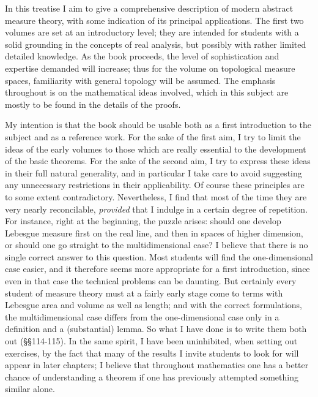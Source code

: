 \bigskip
     
 In this treatise I aim to give a
comprehensive description of modern abstract measure theory, with some
indication of its principal applications.   The first two volumes are
set at an introductory level;  they are intended for students with a
solid grounding in the concepts of real analysis, but possibly with
rather limited detailed knowledge.    As the book proceeds, the
level of sophistication and expertise demanded will increase;  thus for
the volume on topological measure spaces, familiarity with general
topology will be assumed.
The emphasis throughout is on the mathematical ideas involved, which in
this subject are mostly to be found in the details of the proofs.
     
My intention is that the book should be usable both as a first
introduction to the subject and as a reference work.   For the sake of
the first aim, I try to limit the ideas of the early volumes to those
which are really essential to the development of the basic theorems.
For the sake of the second aim, I try to express these ideas in their
full natural generality, and in particular I take care to avoid
suggesting any unnecessary restrictions in their applicability.   Of
course these principles are to some extent contradictory.
Nevertheless, I find that most of the time they are very nearly
reconcilable, {\it provided} that I indulge in a certain degree of
repetition.   For instance, right at the beginning, the puzzle arises:
should one develop Lebesgue measure first on the real line, and then in
spaces of higher dimension, or should one go straight to the
multidimensional case?   I believe that there is no single correct
answer to this question.   Most students will find the one-dimensional
case easier, and it therefore seems more appropriate for a first
introduction, since even in that case the technical problems can be
daunting.   But certainly every student of measure theory must at a
fairly early stage
come to terms with Lebesgue area and volume as well as length;
and with the correct formulations, the multidimensional case differs
from the one-dimensional case only in a definition and a (substantial)
lemma.   So what I have done is to write them both out (\S\S114-115).
In the same spirit, I have been uninhibited, when setting out exercises,
by the fact that many of the results I invite students to look for will
appear in later chapters;  I believe that throughout mathematics one has
a better chance of understanding a theorem if one has previously
attempted something similar alone.
     
